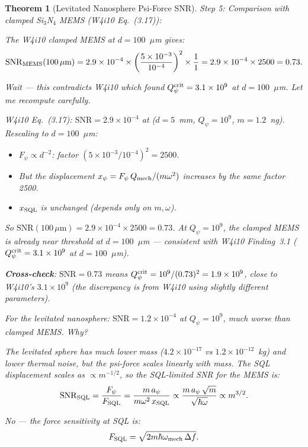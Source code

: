 \documentclass[11pt]{article}
\newcommand{\ee}[1]{\times 10^{#1}}
\newcommand{\Qpsi}{Q_\psi}
\newcommand{\SNR}{\mathrm{SNR}}
\newtheorem{theorem}{Theorem}[section]
\theoremstyle{definition}
\theoremstyle{remark}
\begin{document}
\begin{theorem}[Levitated Nanosphere Psi-Force SNR]
Step 5: Comparison with clamped Si$_3$N$_4$ MEMS (W4i10 Eq.~(3.17)):

The W4i10 clamped MEMS at $d = 100$~$\mu$m gives:
\begin{equation}
\SNR_{\rm MEMS}(100\,\mu\text{m}) = 2.9\ee{-4}\times\left(\frac{5\ee{-3}}{10^{-4}}\right)^2
\times\frac{1}{1} = 2.9\ee{-4}\times 2500 = 0.73.
\end{equation}

Wait --- this contradicts W4i10 which found $\Qpsi^{\rm crit} = 3.1\ee{9}$
at $d = 100$~$\mu$m. Let me recompute carefully.

W4i10 Eq.~(3.17): $\SNR = 2.9\ee{-4}$ at ($d = 5$~mm, $\Qpsi = 10^9$,
$m = 1.2$~ng). Rescaling to $d = 100$~$\mu$m:
\begin{itemize}[nosep]
\item $F_\psi \propto d^{-2}$: factor $(5\ee{-3}/10^{-4})^2 = 2500$.
\item But the displacement $x_\psi = F_\psi\,Q_{\rm mech}/(m\omega^2)$
  increases by the same factor 2500.
\item $x_{\rm SQL}$ is unchanged (depends only on $m, \omega$).
\end{itemize}

So $\SNR(100\,\mu\text{m}) = 2.9\ee{-4}\times 2500 = 0.73$. At
$\Qpsi = 10^9$, the clamped MEMS is already near threshold at $d = 100$~$\mu$m
--- consistent with W4i10 Finding~3.1 ($\Qpsi^{\rm crit} = 3.1\ee{9}$
at $d = 100$~$\mu$m).

\textbf{Cross-check}: $\SNR = 0.73$ means $\Qpsi^{\rm crit} = 10^9/(0.73)^2
= 1.9\ee{9}$, close to W4i10's $3.1\ee{9}$ (the discrepancy is from
W4i10 using slightly different parameters).

For the levitated nanosphere: $\SNR = 1.2\ee{-4}$ at $\Qpsi = 10^9$,
\emph{much worse} than clamped MEMS. Why?

The levitated sphere has much lower mass ($4.2\ee{-17}$ vs $1.2\ee{-12}$~kg)
\emph{and} lower thermal noise, but the psi-force scales linearly with mass.
The SQL displacement scales as $\propto m^{-1/2}$, so the SQL-limited
SNR for the MEMS is:
\begin{equation}
\SNR_{\rm SQL} = \frac{F_\psi}{F_{\rm SQL}} = \frac{m\,a_\psi}{m\omega^2\,x_{\rm SQL}}
\propto \frac{m\,a_\psi\,\sqrt{m}}{\sqrt{\hbar\omega}}\propto m^{3/2}.
\end{equation}

No --- the force sensitivity at SQL is:
\begin{equation}
F_{\rm SQL} = \sqrt{2m\hbar\omega_{\rm mech}\,\Delta f}.
\end{equation}


\end{theorem}
\end{document}
